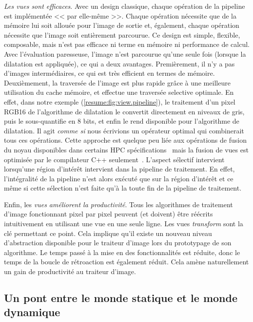 \emph{Les vues sont efficaces}. Avec un design classique, chaque opération de la pipeline est implémentée << par
elle-même >>. Chaque opération nécessite que de la mémoire lui soit allouée pour l'image de sortie et, également, chaque
opération nécessite que l'image soit entièrement parcourue. Ce design est simple, flexible, composable, mais n'est pas
efficace ni terme en mémoire ni performance de calcul. Avec l'évaluation paresseuse, l'image n'est parcourue qu'une
seule fois (lorsque la dilatation est appliquée), ce qui a deux avantages. Premièrement, il n'y a pas d'images
intermédiaires, ce qui est très efficient en termes de mémoire. Deuxièmement, la traversée de l'image est plus rapide
grâce à une meilleure utilisation du cache mémoire, et effectue une traversée selective optimale. En effet, dans notre
exemple (\cref{resume:fig:view.pipeline}), le traitement d'un pixel RGB16 de l'algorithme de dilatation le convertit
directement en niveaux de gris, puis le sous-quantifie en 8 bits, et enfin le rend disponible pour l'algorithme de
dilatation. Il agit \emph{comme si} nous écrivions un opérateur optimal qui combinerait tous ces opérations. Cette
approche est quelque peu liée aux opérations de fusion du noyau disponibles dans certains HPC
spécifications~\parencite{openvx.2019} mais la fusion de vues est optimisée par le compilateur C++
seulement~\parencite{brown.2018.ranges}. L'aspect sélectif intervient lorsqu'une région d'intérêt intervient dans la
pipeline de traitement. En effet, l'intégralité de la pipeline n'est alors exécuté que sur la région d'intérêt et ce
même si cette sélection n'est faite qu'à la toute fin de la pipeline de traitement.

Enfin, les \emph{vues améliorent la productivité}. Tous les algorithmes de traitement d'image fonctionnant pixel par
pixel peuvent (et doivent) être réécrits intuitivement en utilisant une vue en une seule ligne. Les vues
\emph{transform} sont la clé permettant ce point. Cela implique qu'il existe un nouveau niveau d'abstraction disponible
pour le traiteur d'image lors du prototypage de son algorithme. Le temps passé à la mise en \oeuvre des fonctionnalités
est réduite, donc le temps de la boucle de rétroaction est également réduit. Cela amène naturellement un gain de
productivité au traiteur d'image.


\subsection*{Un pont entre le monde statique et le monde dynamique}


